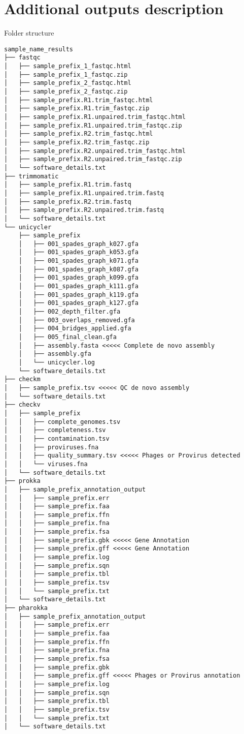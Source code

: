 \documentclass[
]{book}
\begin{document}
\hypertarget{additional-outputs-description}{%
\section{Additional outputs description}\label{additional-outputs-description}}

Folder structure

\begin{verbatim}
sample_name_results
├── fastqc
│   ├── sample_prefix_1_fastqc.html
│   ├── sample_prefix_1_fastqc.zip
│   ├── sample_prefix_2_fastqc.html
│   ├── sample_prefix_2_fastqc.zip
│   ├── sample_prefix.R1.trim_fastqc.html
│   ├── sample_prefix.R1.trim_fastqc.zip
│   ├── sample_prefix.R1.unpaired.trim_fastqc.html
│   ├── sample_prefix.R1.unpaired.trim_fastqc.zip
│   ├── sample_prefix.R2.trim_fastqc.html
│   ├── sample_prefix.R2.trim_fastqc.zip
│   ├── sample_prefix.R2.unpaired.trim_fastqc.html
│   ├── sample_prefix.R2.unpaired.trim_fastqc.zip
│   └── software_details.txt
├── trimmomatic
│   ├── sample_prefix.R1.trim.fastq
│   ├── sample_prefix.R1.unpaired.trim.fastq
│   ├── sample_prefix.R2.trim.fastq
│   ├── sample_prefix.R2.unpaired.trim.fastq
│   └── software_details.txt
└── unicycler
    ├── sample_prefix
    │   ├── 001_spades_graph_k027.gfa
    │   ├── 001_spades_graph_k053.gfa
    │   ├── 001_spades_graph_k071.gfa
    │   ├── 001_spades_graph_k087.gfa
    │   ├── 001_spades_graph_k099.gfa
    │   ├── 001_spades_graph_k111.gfa
    │   ├── 001_spades_graph_k119.gfa
    │   ├── 001_spades_graph_k127.gfa
    │   ├── 002_depth_filter.gfa
    │   ├── 003_overlaps_removed.gfa
    │   ├── 004_bridges_applied.gfa
    │   ├── 005_final_clean.gfa
    │   ├── assembly.fasta <<<<< Complete de novo assembly
    │   ├── assembly.gfa
    │   └── unicycler.log
    └── software_details.txt
├── checkm
│   ├── sample_prefix.tsv <<<<< QC de novo assembly
│   └── software_details.txt
├── checkv 
│   ├── sample_prefix
│   │   ├── complete_genomes.tsv
│   │   ├── completeness.tsv
│   │   ├── contamination.tsv
│   │   ├── proviruses.fna
│   │   ├── quality_summary.tsv <<<<< Phages or Provirus detected
│   │   └── viruses.fna
│   └── software_details.txt
├── prokka
│   ├── sample_prefix_annotation_output
│   │   ├── sample_prefix.err
│   │   ├── sample_prefix.faa
│   │   ├── sample_prefix.ffn
│   │   ├── sample_prefix.fna
│   │   ├── sample_prefix.fsa
│   │   ├── sample_prefix.gbk <<<<< Gene Annotation
│   │   ├── sample_prefix.gff <<<<< Gene Annotation
│   │   ├── sample_prefix.log
│   │   ├── sample_prefix.sqn
│   │   ├── sample_prefix.tbl
│   │   ├── sample_prefix.tsv
│   │   └── sample_prefix.txt
│   └── software_details.txt
├── pharokka
│   ├── sample_prefix_annotation_output
│   │   ├── sample_prefix.err
│   │   ├── sample_prefix.faa
│   │   ├── sample_prefix.ffn
│   │   ├── sample_prefix.fna
│   │   ├── sample_prefix.fsa
│   │   ├── sample_prefix.gbk
│   │   ├── sample_prefix.gff <<<<< Phages or Provirus annotation
│   │   ├── sample_prefix.log
│   │   ├── sample_prefix.sqn
│   │   ├── sample_prefix.tbl
│   │   ├── sample_prefix.tsv
│   │   └── sample_prefix.txt
│   └── software_details.txt

  
\end{verbatim}
\end{document}
